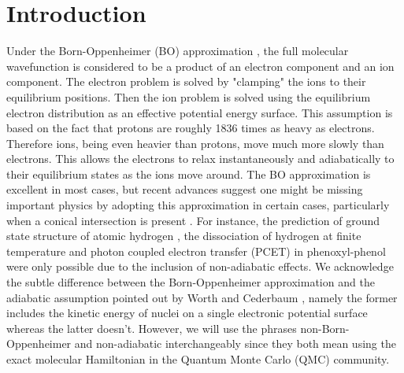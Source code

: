 \documentclass[aps,prl,superscriptaddress,groupedaddress]{revtex4}
\begin{document}


\maketitle

\section{Introduction}
Under the Born-Oppenheimer (BO) approximation \cite{BO}, the full molecular wavefunction is considered to be a product of an electron component and an ion component. The electron problem is solved by "clamping" the ions to their equilibrium positions. Then the ion problem is solved using the equilibrium electron distribution as an effective potential energy surface. This assumption is based on the fact that protons are roughly 1836 times as heavy as electrons. Therefore ions, being even heavier than protons, move much more slowly than electrons. This allows the electrons to relax instantaneously and adiabatically to their equilibrium states as the ions move around. The BO approximation is excellent in most cases, but recent advances suggest one might be missing important physics by adopting this approximation in certain cases, particularly when a conical intersection is present \cite{Cederbaum_BO}. For instance, the prediction of ground state structure of atomic hydrogen \cite{Ceperley_1987,Natoli_1993,Natoli_1995}, the dissociation of hydrogen at finite temperature \cite{Mazzola_FiniteT} and photon coupled electron transfer (PCET) in phenoxyl-phenol \cite{Sirjoosingh_PCET} were only possible due to the inclusion of non-adiabatic effects. We acknowledge the subtle difference between the Born-Oppenheimer approximation and the adiabatic assumption pointed out by Worth and Cederbaum \cite{Cederbaum_BO}, namely the former includes the kinetic energy of nuclei on a single electronic potential surface whereas the latter doesn't. However, we will use the phrases non-Born-Oppenheimer and non-adiabatic interchangeably since they both mean using the exact molecular Hamiltonian in the Quantum Monte Carlo (QMC) community.
\end{document}
